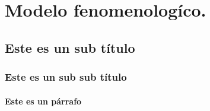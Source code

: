 \documentclass[../Main.tex]{subfiles}
\begin{document}
\section{Modelo fenomenologíco.}


\subsection{Este es un sub título}

\lipsum[15-17] %

\subsubsection{Este es un sub sub título}

\lipsum[15-17] %

\paragraph{Este es un párrafo}

\lipsum[18-19] %

\biblio %
\end{document}
